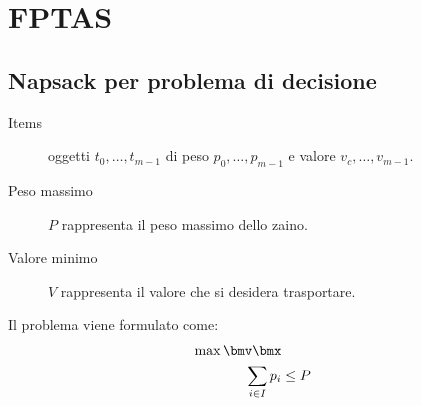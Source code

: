 \documentclass[\main/main.tex]{subfiles}
\begin{document}
\section{FPTAS}
\subsection{Napsack per problema di decisione}
\begin{description}
  \item[Items] oggetti \(t_0, \ldots, t_{m-1}\) di peso \(p_0, \ldots, p_{m-1}\) e valore \(v_c, \ldots, v_{m-1}\).
  \item[Peso massimo] \(P\) rappresenta il peso massimo dello zaino.
  \item[Valore minimo] \(V\) rappresenta il valore che si desidera trasportare.
\end{description}
Il problema viene formulato come:
\begin{align*}
  \max \bmv\bmx               \\
  \sum_{i \in I} p_i & \leq P
\end{align*}
\end{document}
